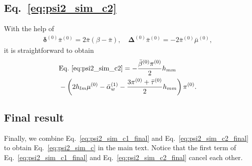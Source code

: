 \documentclass[aps,prd,amsmath,floats,floatfix, twocolumn,
superscriptaddress,nofootinbib,showpacs]{revtex4-1}
\begin{document}
\subsection{\texorpdfstring{Eq.~\eqref{eq:psi2_sim_c2}}{Derivation of Equationc1}}
With the help of
\begin{align}
    \bm{\delta}^{(0)}\bar{\pi}^{(0)}=2\bar{\pi}(\beta-\bar{\pi}),\quad \bm{\Delta}^{(0)}\bar{\pi}^{(0)}=-2\bar{\pi}^{(0)}\bar{\mu}^{(0)},
\end{align}
it is straightforward to obtain
\begin{align}
    &{\rm{Eq.~\eqref{eq:psi2_sim_c2}}}=-\frac{\bar{\beta}^{(0)}\pi^{(0)}}{2}h_{mm}\notag \\
    &-\left(2h_{lm}\mu^{(0)}-\bar{\alpha}_w^{(1)}-\frac{3\pi^{(0)}+\bar{\tau}^{(0)}}{2}h_{mm}\right)\pi^{(0)}. \label{eq:psi2_sim_c2_final}
\end{align}

\subsection{Final result}
Finally, we combine Eq.~\eqref{eq:psi2_sim_c1_final} and Eq.~\eqref{eq:psi2_sim_c2_final} to obtain Eq.~\eqref{eq:psi2_sim_c} in the main text. Notice that the first term of Eq.~\eqref{eq:psi2_sim_c1_final} and Eq.~\eqref{eq:psi2_sim_c2_final} cancel each other.
\end{document}
